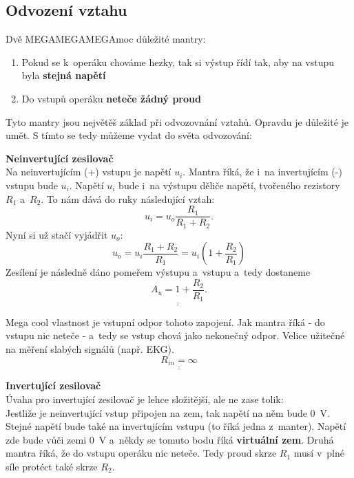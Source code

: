 \documentclass[a4paper,12pt]{article}   %
\begin{document}
\subsection*{Odvození vztahu}
Dvě MEGAMEGAMEGAmoc důležité mantry:
\begin{enumerate}
    \item Pokud se k~operáku chováme hezky, tak si výstup řídí tak, aby na vstupu byla \textbf{stejná napětí}
    \item Do vstupů operáku \textbf{neteče žádný proud}
\end{enumerate}
Tyto mantry jsou největěš základ při odvozovnání vztahů. Opravdu je důležité je umět. S tímto se tedy můžeme vydat do světa odvozování:

\textbf{Neinvertující zesilovač}\\
Na neinvertujícím (+) vstupu je napětí $u_i$. Mantra říká, že i~na invertujícím (-) vstupu bude $u_i$. Napětí $u_i$ bude i~na výstupu děliče napětí, tvořeného rezistory $R_1$ a~$R_2$. To nám dává do ruky následující vztah:
\begin{equation*}
    u_i = u_o \frac{R_1}{R_1 + R_2}.
\end{equation*}
Nyní si už stačí vyjádřit $u_o$:
\begin{equation*}
    u_o = u_i \frac{R_1 + R_2}{R_1} = u_i (1+\frac{R_2}{R_1})
\end{equation*}
Zesílení je následně dáno pomeřem výstupu a~vstupu a~tedy dostaneme
\begin{equation*}
    \underline{\underline{A_u = 1+\frac{R_2}{R_1}}}.
\end{equation*}

Mega cool vlastnost je vstupní odpor tohoto zapojení. Jak mantra říká - do vstupu nic neteče - a~tedy se vstup chová jako nekonečný odpor. Velice užitečné na měření slabých signálů (např. EKG).
\begin{equation*}
    \underline{\underline{R_{in} = \infty}}
\end{equation*}

\textbf{Invertující zesilovač}\\
Úvaha pro invertující zesilovač je lehce složitější, ale ne zase tolik:\\
Jestliže je neinvertující vstup připojen na zem, tak napětí na něm bude $0$~V. Stejné napětí bude také na invertujícím vstupu (to říká jedna z~manter). Napětí zde bude vůči zemi 0~V a~někdy se tomuto bodu říká \textbf{virtuální zem}. Druhá mantra říká, že do vstupu operáku nic neteče. Tedy proud skrze $R_1$ musí v~plné síle protéct také skrze $R_2$.
\end{document}
